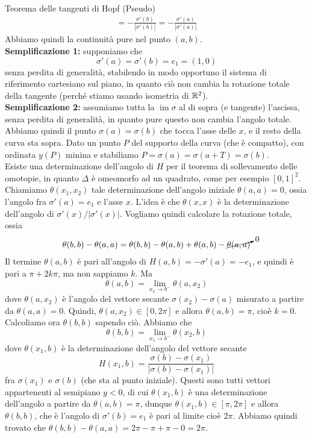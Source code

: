 \documentclass[a4paper]{article}
\begin{document}
\begin{snippetproof}{Teorema delle tangenti di Hopf (Pseudo)}
\begin{align*}
        = -\frac{\sigma'(b)}{|\sigma'(b)|} = -\frac{\sigma'(a)}{|\sigma'(a)|}
    \end{align*}
    Abbiamo quindi la continuità pure nel punto \((a,b)\). \\
    \textbf{Semplificazione 1:} supponiamo che
    \[
        \sigma'(a) = \sigma'(b) = e_1 = (1,0)
    \]
    senza perdita di generalità, stabilendo in modo opportuno il sistema di riferimento cartesiano
    sul piano, in quanto ciò non cambia la rotazione totale della tangente
    (perché stiamo usando isometria di \(\mathbb{R}^2\)). \\
    \textbf{Semplificazione 2:} assumiamo tutta la \(\operatorname{im}\sigma\)
    al di sopra (e tangente) l'ascissa, senza perdita di generalità,
    in quanto pure questo non cambia l'angolo totale.
    Abbiamo quindi il punto \(\sigma(a) = \sigma(b)\)
    che tocca l'asse delle \(x\), e il resto della curva sta sopra.
    Dato un punto \(P\) del supporto della curva (che è compatto),
    con ordinata \(y(P)\) minina e stabiliamo \(P = \sigma(a) = \sigma(a+T) = \sigma(b)\). \\
    Esiste una determinazione dell'angolo di \(H\)
    per il teorema di sollevamento delle omotopie, in quanto
    \(\Delta\) è omeomorfo ad un quadrato, come per esempio \([0,1]^2\).
    Chiamiamo \(\theta(x_1, x_2)\) tale determinazione dell'angolo iniziale
    \(\theta(a,a) = 0\), ossia l'angolo fra \(\sigma'(a) = e_1\) e l'asse \(x\).
    L'idea è che \(\theta(x,x)\) è la determinazione dell'angolo di
    \(\sigma'(x)/|\sigma'(x)|\). Vogliamo quindi calcolare la rotazione totale, ossia
    \begin{align*}
        \theta(b,b) - \theta(a,a) &= \theta(b,b) - \theta(a,b) + \theta(a,b) - \cancelto{0}{\theta(a,a)} \\
    \end{align*}
    Il termine \(\theta(a,b)\) è pari all'angolo di \(H(a,b) = -\sigma'(a) = -e_1\),
    e quindi è pari a \(\pi + 2k\pi\), ma non sappiamo \(k\).
    Ma \[
        \theta(a,b) = \lim_{x_2 \to b^-} \theta(a,x_2)
    \]
    dove \(\theta(a,x_2)\) è l'angolo del vettore secante \(\sigma(x_2) - \sigma(a)\)
    misurato a partire da \(\theta(a,a) = 0\).
    Quindi, \(\theta(a,x_2) \in [0, 2\pi]\)
    e allora \(\theta(a,b) = \pi\), cioè \(k=0\).
    Calcoliamo ora \(\theta(b,b)\) sapendo ciò.
    Abbiamo che
    \[
        \theta(b,b) = \lim_{x_1 \to b^-} \theta(x_2,b)
    \]
    dove \(\theta(x_1, b)\) è la determinazione dell'angolo
    del vettore secante
    \[
        H(x_1, b) = \frac{\sigma(b) - \sigma(x_1)}{|\sigma(b) - \sigma(x_1)|}
    \]
    fra \(\sigma(x_1)\) e \(\sigma(b)\) (che sta al punto iniziale).
    Questi sono tutti vettori appartenenti al semipiano \(y<0\),
    di cui \(\theta(x_1, b)\) è una determinazione dell'angolo a partire da
    \(\theta(a,b) = \pi\), dunque \(\theta(x_1, b) \in [\pi, 2\pi]\)
    e allora \(\theta(b,b)\), che è l'angolo di \(\sigma'(b) = e_1\)
    è pari al limite cioè \(2\pi\).
    Abbiamo quindi trovato che
    \(\theta(b,b) - \theta(a,a) = 2\pi - \pi + \pi - 0 = 2\pi\).
\end{snippetproof}
\end{document}
